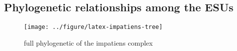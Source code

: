 \documentclass{article}\usepackage[]{graphicx}\usepackage[]{color}
\makeatletter
\def\maxwidth{ %
  \ifdim\Gin@nat@width>\linewidth
    \linewidth
  \else
    \Gin@nat@width
  \fi
}
\newenvironment{kframe}{%
 \def\at@end@of@kframe{}%
 \ifinner\ifhmode%
  \def\at@end@of@kframe{\end{minipage}}%
  \begin{minipage}{\columnwidth}%
 \fi\fi%
 \def\FrameCommand##1{\hskip\@totalleftmargin \hskip-\fboxsep
 \colorbox{shadecolor}{##1}\hskip-\fboxsep
     \hskip-\linewidth \hskip-\@totalleftmargin \hskip\columnwidth}%
 \MakeFramed {\advance\hsize-\width
   \@totalleftmargin\z@ \linewidth\hsize
   \@setminipage}}%
 {\par\unskip\endMakeFramed%
 \at@end@of@kframe}
\newenvironment{knitrout}{}{} %
\makeatother
\begin{document}
\subsection{Phylogenetic relationships among the ESUs}
\begin{knitrout}
\color{fgcolor}\begin{kframe}


{\ttfamily\noindent\bfseries{}}\end{kframe}\begin{figure}[]


{\centering \texttt{[image: ../figure/latex-impatiens-tree]} 

}

\caption[full phylogenetic of the impatiens complex]{full phylogenetic of the impatiens complex\label{fig:impatiens-tree}}
\end{figure}


\end{knitrout}








\end{document}

